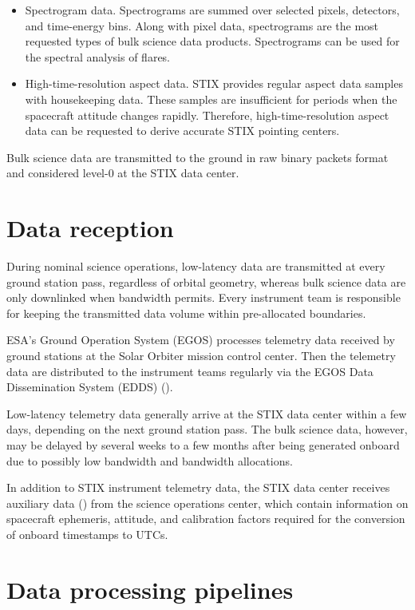 \documentclass[referee]{aa} %
\begin{document}
\begin{itemize}
\item Spectrogram data. Spectrograms are summed over selected pixels, detectors, and time-energy bins. Along with pixel data, spectrograms are the most requested types of bulk science data products. Spectrograms can be used for the spectral analysis of flares.

\item High-time-resolution aspect data. STIX provides regular aspect data samples with housekeeping data. These samples are insufficient for periods when the spacecraft attitude changes rapidly. Therefore, high-time-resolution aspect data can be requested to derive accurate STIX pointing centers.
\end{itemize}

Bulk science data are transmitted to the ground in raw binary packets format and considered level-0 at the STIX data center.  

\section{Data reception}
During nominal science operations, low-latency data are transmitted at every ground station pass, regardless of orbital geometry, whereas bulk science data are only downlinked when bandwidth permits. Every instrument team is responsible for keeping the transmitted data volume within pre-allocated boundaries.

ESA's Ground Operation System (EGOS) processes telemetry data received by ground stations at the Solar Orbiter mission control center. Then the telemetry data are distributed to the instrument teams regularly via the EGOS Data Dissemination System (EDDS) (\cite{EDDS}). 

Low-latency telemetry data generally arrive at the STIX data center within a few days, depending on the next ground station pass. The bulk science data, however, may be delayed by several weeks to a few months after being generated onboard due to possibly low bandwidth and bandwidth allocations.

In addition to STIX instrument telemetry data, the STIX data center receives auxiliary data (\cite{spice1996,spice2018}) from the science operations center, which contain information on spacecraft ephemeris, attitude, and calibration factors required for the conversion of onboard timestamps to UTCs. 

\section{Data processing pipelines}
\end{document}

